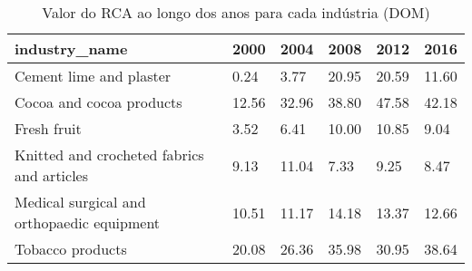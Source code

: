 \begin{table}
\centering
\caption{Valor do RCA ao longo dos anos para cada indústria (DOM)}
\begin{tabular}{p{6cm}p{1.5cm}p{1.5cm}p{1.5cm}p{1.5cm}p{1.5cm}}
\toprule
                             industry\_name &  2000 &  2004 &  2008 &  2012 &  2016 \\
\midrule
                   Cement lime and plaster &  0.24 &  3.77 & 20.95 & 20.59 & 11.60 \\
                  Cocoa and cocoa products & 12.56 & 32.96 & 38.80 & 47.58 & 42.18 \\
                               Fresh fruit &  3.52 &  6.41 & 10.00 & 10.85 &  9.04 \\
Knitted and crocheted fabrics and articles &  9.13 & 11.04 &  7.33 &  9.25 &  8.47 \\
Medical surgical and orthopaedic equipment & 10.51 & 11.17 & 14.18 & 13.37 & 12.66 \\
                          Tobacco products & 20.08 & 26.36 & 35.98 & 30.95 & 38.64 \\
\bottomrule
\end{tabular}
\end{table}
